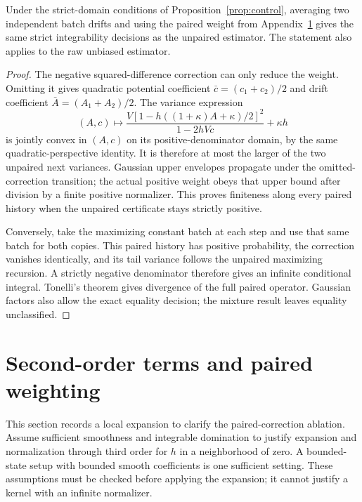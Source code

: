 \begin{corollary}\label{cor:paired}
Under the strict-domain conditions of Proposition~\ref{prop:control}, averaging two independent batch drifts and using the paired weight from Appendix~\ref{app:local} gives the same strict integrability decisions as the unpaired estimator. The statement also applies to the raw unbiased estimator.
\end{corollary}
\begin{proof}
The negative squared-difference correction can only reduce the weight. Omitting it gives quadratic potential coefficient $\bar c=(c_1+c_2)/2$ and drift coefficient $\bar A=(A_1+A_2)/2$. The variance expression
\[
 (A,c)\longmapsto\frac{V[1-h((1+\kappa)A+\kappa)/2]^2}{1-2hVc}+\kappa h
\]
is jointly convex in $(A,c)$ on its positive-denominator domain, by the same quadratic-perspective identity. It is therefore at most the larger of the two unpaired next variances. Gaussian upper envelopes propagate under the omitted-correction transition; the actual positive weight obeys that upper bound after division by a finite positive normalizer. This proves finiteness along every paired history when the unpaired certificate stays strictly positive.

Conversely, take the maximizing constant batch at each step and use that same batch for both copies. This paired history has positive probability, the correction vanishes identically, and its tail variance follows the unpaired maximizing recursion. A strictly negative denominator therefore gives an infinite conditional integral. Tonelli's theorem gives divergence of the full paired operator. Gaussian factors also allow the exact equality decision; the mixture result leaves equality unclassified.
\end{proof}

\section{Second-order terms and paired weighting}\label{app:local}
This section records a local expansion to clarify the paired-correction ablation. Assume sufficient smoothness and integrable domination to justify expansion and normalization through third order for $h$ in a neighborhood of zero. A bounded-state setup with bounded smooth coefficients is one sufficient setting. These assumptions must be checked before applying the expansion; it cannot justify a kernel with an infinite normalizer.

